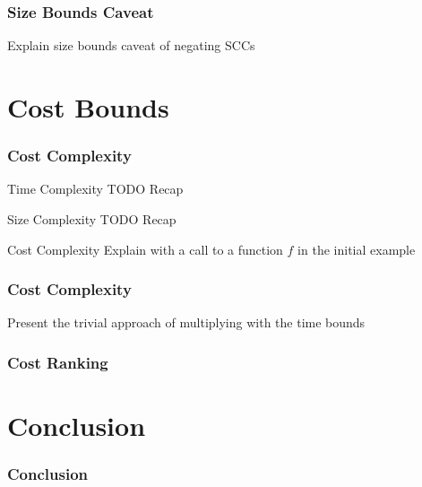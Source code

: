 \documentclass{beamer}
\begin{document}
\begin{frame}
  \frametitle{Size Bounds Caveat}
  Explain size bounds caveat of negating SCCs
\end{frame}

\section{Cost Bounds}

\begin{frame}
  \frametitle{Cost Complexity}
  \begin{block}{Time Complexity}
    TODO Recap
  \end{block}
  \pause
  \begin{block}{Size Complexity}
    TODO Recap
  \end{block}
  \pause
  \begin{block}{Cost Complexity}
    Explain with a call to a function $f$ in the initial example 
  \end{block}
\end{frame}

\begin{frame}
  \frametitle{Cost Complexity}
  Present the trivial approach of multiplying with the time bounds
\end{frame}

\begin{frame}
  \frametitle{Cost Ranking}
\end{frame}

\section{Conclusion}

\begin{frame}
  \frametitle{Conclusion}
\end{frame}
\end{document}

